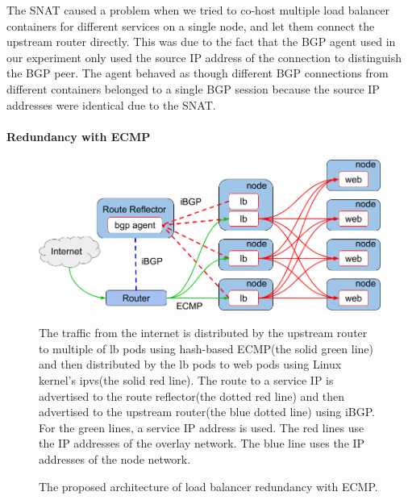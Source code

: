 The SNAT caused a problem when we tried to co-host multiple load balancer containers for different services on a single node, and let them connect the upstream router directly.
This was due to the fact that the BGP agent used in our experiment only used the source IP address of the connection to distinguish the BGP peer.
The agent behaved as though different BGP connections from different containers belonged to a single BGP session because the source IP addresses were identical due to the SNAT.


\paragraph{\bf Redundancy with ECMP}\label{Redundancy with ECMP}

\begin{figure}[tb]
\begin{center}
\includegraphics[width=\columnwidth]{Figs/ecmp.png}
\end{center}
\caption{The proposed architecture of load balancer redundancy with ECMP.}
  The traffic from the internet is distributed by the upstream router to multiple of lb pods using hash-based ECMP(the solid green line) and then distributed by the lb pods to web pods using Linux kernel's ipvs(the solid red line).
  The route to a service IP is advertised to the route reflector(the dotted red line) and then advertised to the upstream router(the blue dotted line) using iBGP.
  For the green lines, a service IP address is used. The red lines use the IP addresses of the overlay network. The blue line uses the IP addresses of the node network.

\label{fig:ecmp}
\end{figure}

